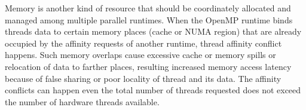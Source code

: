 Memory is another kind of resource that should be coordinately allocated and managed among
multiple parallel runtimes. %
When the OpenMP runtime binds threads data to 
certain memory places (cache or NUMA region) that are already occupied by 
the affinity requests of another runtime, thread affinity conflict happens.  
Such memory overlaps cause excessive cache or memory spills or relocation of data
to farther places, resulting increased memory access latency because of false sharing or 
poor locality of thread and its data. %
The affinity conflicts can happen even the total number of threads requested does not exceed the number of hardware threads available.

